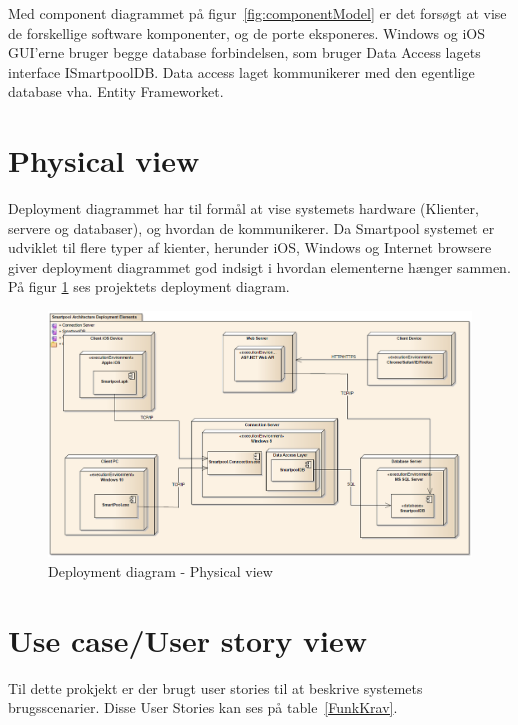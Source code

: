Med component diagrammet på figur~\ref{fig:componentModel} er det forsøgt at vise de forskellige software komponenter, og de porte eksponeres. Windows og iOS GUI'erne bruger begge database forbindelsen, som bruger Data Access lagets interface ISmartpoolDB. Data access laget kommunikerer med den egentlige database vha. Entity Frameworket.

\section{Physical view}
 
Deployment diagrammet har til formål at vise systemets hardware (Klienter, servere og databaser), og hvordan de kommunikerer. Da Smartpool systemet er udviklet til flere typer af kienter, herunder iOS, Windows og Internet browsere giver deployment diagrammet god indsigt i hvordan elementerne hænger sammen.
På figur \ref{fig:deploymentView} ses projektets deployment diagram.

\begin{figure}
	\centering
	\includegraphics[width=\linewidth]{figs/arkitektur/deploymentView.PNG}
	\caption{Deployment diagram - Physical view}
	\label{fig:deploymentView}
\end{figure}

\section{Use case/User story view}
Til dette prokjekt er der brugt user stories til at beskrive systemets brugsscenarier. Disse User Stories kan ses på table~\ref{FunkKrav}.


